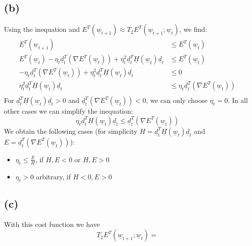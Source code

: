 \documentclass[10pt]{article}
\begin{document}
\subsection*{(b)}
Using the inequation and $E^T(\underline{w}_{t+1}) \approx T_2E^T(\underline{w}_{t+1}; \underline{w}_t)$, we find:
\begin{equation*}
\begin{aligned}
E^T(\underline{w}_{t+1}) & \leq E^T(\underline{w}_{t})\\
E^T(\underline{w}_{t}) - \eta_t \underline{d}_t^T(\nabla E^T(\underline{w}_t)) + \eta_t^2 \underline{d}_t^T \underline{H}(\underline{w}_t)\underline{d}_t & \leq E^T(\underline{w}_{t})\\
- \eta_t \underline{d}_t^T(\nabla E^T(\underline{w}_t)) + \eta_t^2 \underline{d}_t^T \underline{H}(\underline{w}_t)\underline{d}_t & \leq 0\\
\eta_t^2 \underline{d}_t^T \underline{H}(\underline{w}_t)\underline{d}_t & \leq \eta_t \underline{d}_t^T(\nabla E^T(\underline{w}_t))\\
\end{aligned}
\end{equation*}
For $\underline{d}_t^T \underline{H}(\underline{w}_t)\underline{d}_t > 0$ and $\underline{d}_t^T(\nabla E^T(\underline{w}_t)) < 0$, we can only choose $\eta_t = 0$. In all other cases we can simplify the inequation:
$$\eta_t \underline{d}_t^T \underline{H}(\underline{w}_t)\underline{d}_t \leq \underline{d}_t^T(\nabla E^T(\underline{w}_t))$$
We obtain the following cases (for simplicity $H = \underline{d}_t^T \underline{H}(\underline{w}_t)\underline{d}_t$ and $E = \underline{d}_t^T(\nabla E^T(\underline{w}_t))$):
\begin{itemize}
\item $\eta_t \leq \frac{E}{H}$, if $H,E < 0$ or $H,E > 0$\\
\item $\eta_t> 0$ arbitrary, if $H < 0, E > 0$
\end{itemize}

\subsection*{(c)}
With this cost function we have
$$T_2E^T(\underline{w}_{t+1};\underline{w}_{t}) = $$
\end{document}
